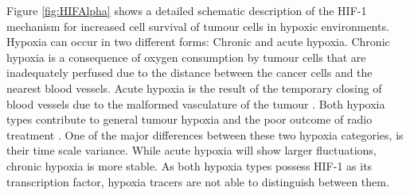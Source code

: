 Figure \ref{fig:HIFAlpha} shows a detailed schematic description of the HIF-1 mechanism for increased cell survival of tumour cells in hypoxic environments. Hypoxia can occur in two different forms: Chronic and acute hypoxia. Chronic hypoxia is a consequence of oxygen consumption by tumour cells that are inadequately perfused due to the distance between the cancer cells and the nearest blood vessels. Acute hypoxia is the result of the temporary closing of blood vessels due to the malformed vasculature of the tumour \cite{Simon}. Both hypoxia types contribute to general tumour hypoxia and the poor outcome of radio treatment \cite{pmid14516104}. One of the major differences between these two hypoxia categories, is their time scale variance. While acute hypoxia will show larger fluctuations, chronic hypoxia is more stable. As both hypoxia types possess HIF-1 as its transcription factor, hypoxia tracers are not able to distinguish between them.
